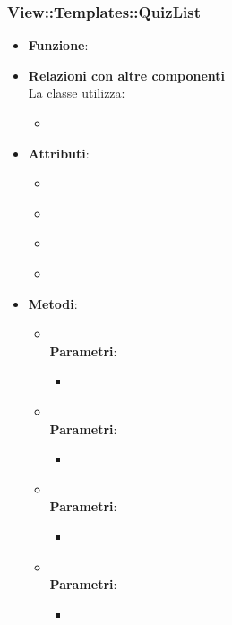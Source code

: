 \subsubsection{View::Templates::QuizList}
\begin{itemize}
\item\textbf{Funzione}:
\item\textbf{Relazioni con altre componenti}\\
La classe utilizza:
	\begin{itemize}
		\item
	\end{itemize}
\item\textbf{Attributi}:
	\begin{itemize}
		\item\code{}\\
		\item\code{}\\
		\item\code{}\\
		\item\code{}\\
	\end{itemize}
\item\textbf{Metodi}:
	\begin{itemize}
		\item\code{}\\
		\textbf{Parametri}:
			\begin{itemize}
				\item\code{}\\
			\end{itemize}
		\item\code{}\\
		\textbf{Parametri}:
			\begin{itemize}
				\item\code{}\\
			\end{itemize}
		\item\code{}\\
		\textbf{Parametri}:
			\begin{itemize}
				\item\code{}\\
			\end{itemize}
		\item\code{}\\
		\textbf{Parametri}:
			\begin{itemize}
				\item\code{}\\
			\end{itemize}
	\end{itemize}
\end{itemize}

